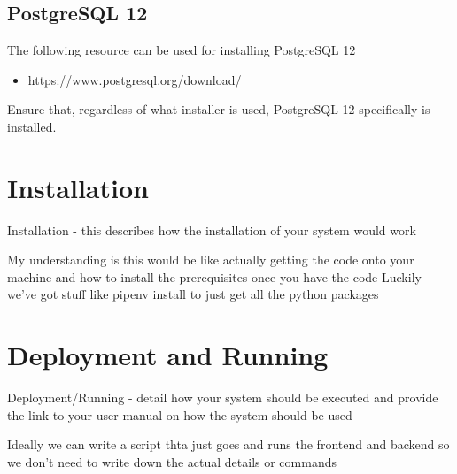\documentclass{article}
\begin{document}
\subsection{PostgreSQL 12}
The following resource can be used for installing PostgreSQL 12
\begin{itemize}
    \item https://www.postgresql.org/download/
\end{itemize}
Ensure that, regardless of what installer is used, PostgreSQL 12 specifically is installed.


\section{Installation}
Installation - this describes how the installation of your system would work

My understanding is this would be like actually getting the code onto your machine and how to install the prerequisites once you have the code
Luckily we've got stuff like pipenv install to just get all the python packages


\section{Deployment and Running}
Deployment/Running - detail how your system should be executed and provide the link to your user
manual on how the system should be used

Ideally we can write a script thta just goes and runs the frontend and backend so we don't need to write down the actual details or commands
\end{document}
